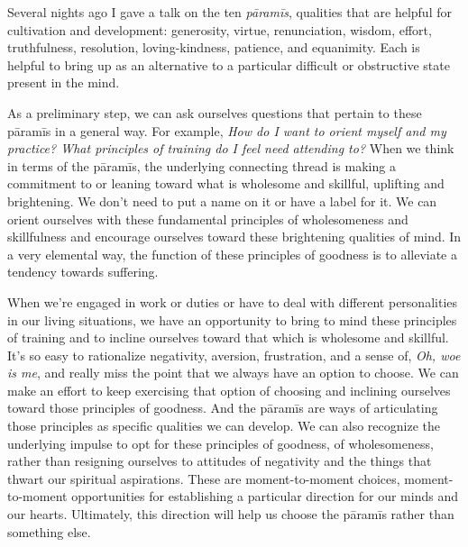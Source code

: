 
Several nights ago I gave a talk on the ten \emph{pāramīs}, qualities 
that are helpful for cultivation and development: generosity, virtue, 
renunciation, wisdom, effort, truthfulness, resolution, 
loving-kindness, patience, and equanimity. Each is helpful to bring up 
as an alternative to a particular difficult or obstructive state 
present in the mind.

As a preliminary step, we can ask ourselves questions that pertain to 
these pāramīs in a general way. For example, \emph{How do I want to 
orient myself and my practice? What principles of training do I feel 
need attending to?} When we think in terms of the pāramīs, the 
underlying connecting thread is making a commitment to or leaning 
toward what is wholesome and skillful, uplifting and brightening. We 
don't need to put a name on it or have a label for it. We can orient 
ourselves with these fundamental principles of wholesomeness and 
skillfulness and encourage ourselves toward these brightening qualities 
of mind. In a very elemental way, the function of these principles of 
goodness is to alleviate a tendency towards suffering.

When we're engaged in work or duties or have to deal with different 
personalities in our living situations, we have an opportunity to bring 
to mind these principles of training and to incline ourselves toward 
that which is wholesome and skillful. It's so easy to rationalize 
negativity, aversion, frustration, and a sense of, \emph{Oh, woe is 
me}, and really miss the point that we always have an option to choose. 
We can make an effort to keep exercising that option of choosing and 
inclining ourselves toward those principles of goodness. And the 
pāramīs are ways of articulating those principles as specific 
qualities we can develop. We can also recognize the underlying impulse 
to opt for these principles of goodness, of wholesomeness, rather than 
resigning ourselves to attitudes of negativity and the things that 
thwart our spiritual aspirations. These are moment-to-moment choices, 
moment-to-moment opportunities for establishing a particular direction 
for our minds and our hearts. Ultimately, this direction will help us 
choose the pāramīs rather than something else.

